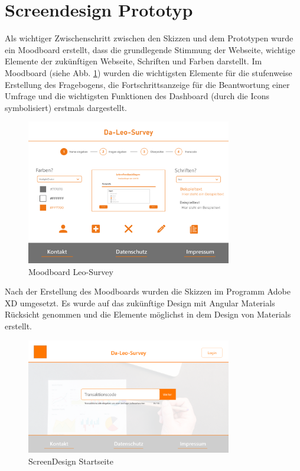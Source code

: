 \newpage

\section{Screendesign Prototyp}
Als wichtiger Zwischenschritt zwischen den Skizzen und dem Prototypen wurde ein Moodboard erstellt, dass die grundlegende 
Stimmung der Webseite, wichtige Elemente der zukünftigen Webseite, Schriften und Farben darstellt. Im Moodboard (siehe Abb. \ref{fig:moodboard}) 
wurden die wichtigsten Elemente für die stufenweise Erstellung des Fragebogens, die Fortschrittsanzeige für die 
Beantwortung einer Umfrage und die wichtigsten Funktionen des Dashboard (durch die Icons symbolisiert) erstmals dargestellt.

\begin{figure}[H]
    \includegraphics[width=0.8\textwidth]{pics/Moodboard.png}
    \centering
    \caption{Moodboard Leo-Survey}
    \label{fig:moodboard}
\end{figure}

Nach der Erstellung des Moodboards wurden die Skizzen im Programm Adobe XD umgesetzt. 
Es wurde auf das zukünftige Design mit 
Angular Materials Rücksicht genommen und die Elemente möglichst in dem Design von Materials erstellt.

\begin{figure}[H]
    \includegraphics[width=0.8\textwidth]{pics/Startseite.png}
    \centering
    \caption{ScreenDesign Startseite}
    \label{fig:screenDesign2}
\end{figure}

